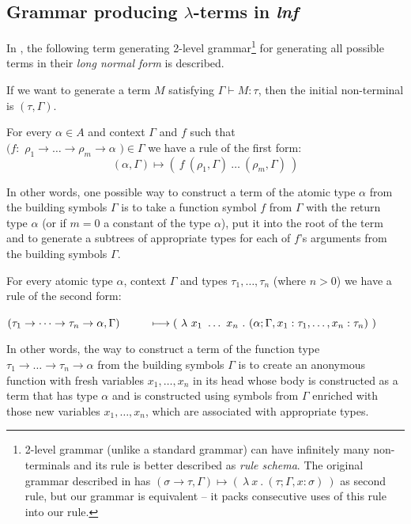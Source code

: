 \documentclass{sig-alternate}
\newcommand{\lterms}{$\lambda$-terms\xspace}
\newcommand{\tur}[3]{#1\vdash{}#2 \colon #3}
\newcommand{\lnf}{\textit{lnf}\xspace}
\newcommand{\ar}{\rightarrow\xspace}
\newcommand{\gar}{\longmapsto}
\begin{document}
\subsection{Grammar producing \lterms in \lnf}

In \cite{barendregt10}, the following term generating 2-level grammar\footnote{2-level grammar (unlike a standard grammar) can have infinitely many non-terminals and its rule is better described as \textit{rule schema}. The original grammar described in \cite{barendregt10} has $( \sigma \rightarrow \tau , \Gamma ) \gar (~\lambda~x~.~( \tau ; \Gamma,x:\sigma )~)$ as second rule, but our grammar is equivalent -- it packs consecutive uses of this rule into our rule.} for generating all possible
terms in their \textit{long normal form} is described.

If we want to generate a term $M$ satisfying $\tur{\Gamma}{M}{\tau}$,
then the initial non-terminal is $(\tau, \Gamma)$.

For every $\alpha \in A$ and context $\Gamma$ and $f$ such that \\
$(f :$ $\rho_1 \ar \dots \ar \rho_m \ar \alpha$ $) \in \Gamma$ 
we have a rule of the first form:
$$
( \alpha , \Gamma ) \gar 
(~f~( \rho_1 , \Gamma )~\dots~( \rho_m , \Gamma )~)
$$

In other words, one possible way to construct a term of 
the atomic type $\alpha$ from the building symbols $\Gamma$
is to take a function symbol $f$ from $\Gamma$ with 
the return type $\alpha$ (or if $m=0$ a constant of the type $\alpha$),
put it into the root of the term and to generate 
a subtrees of appropriate types for each of $f$'s arguments
from the building symbols $\Gamma$.  

For every atomic type $\alpha$, context $\Gamma$ and types
$\tau_1 , \dots , \tau_n$ (where $n > 0$) 
we have a rule of the second form:

$
( \tau_1 \ar \dots \ar \tau_n \ar \alpha , \Gamma )  
 \\ ~~~~~~~~\gar
(~\lambda~x_1~\dots~x_n~.~
( \alpha ; \Gamma , x_1:\tau_1 , \dots , x_n:\tau_n  )~)
$

In other words, the way to construct a term of 
the function type $\tau_1 \ar \dots \ar \tau_n \ar \alpha$ 
from the building symbols $\Gamma$
is to create an anonymous function
with fresh variables $x_1, \dots , x_n$ in its head 
whose body is constructed as a term that has type $\alpha$
and is constructed using symbols from $\Gamma$ 
enriched with those new variables $x_1, \dots , x_n$,
which are associated with appropriate types.
  
\end{document}
